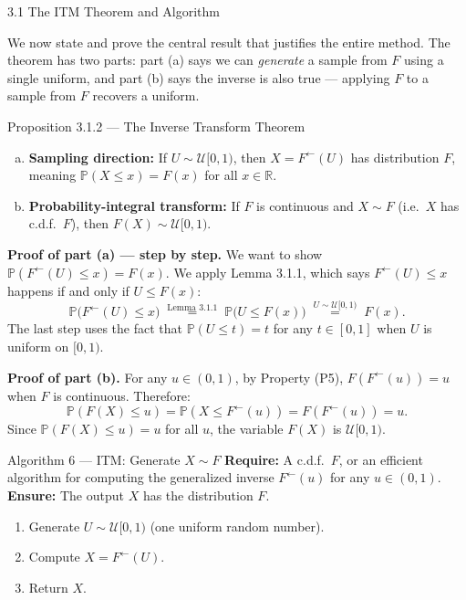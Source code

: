 \documentclass[aspectratio=169,10pt]{beamer}
\newcommand{\PP}{\mathbb{P}}
\newcommand{\RR}{\mathbb{R}}
\newcommand{\UU}{\mathcal{U}}
\newcommand{\FInv}{F^{\leftarrow}}
\begin{document}
\begin{frame}[allowframebreaks]{3.1 The ITM Theorem and Algorithm}

We now state and prove the central result that justifies the entire method.
The theorem has two parts: part (a) says we can \emph{generate} a sample from $F$
using a single uniform, and part (b) says the inverse is also true --- applying $F$
to a sample from $F$ recovers a uniform.

\begin{block}{Proposition 3.1.2 --- The Inverse Transform Theorem}
  \begin{enumerate}[(a)]
    \item \textbf{Sampling direction:} If $U \sim \UU[0,1)$, then
          $X = \FInv(U)$ has distribution $F$, meaning $\PP(X \le x) = F(x)$
          for all $x \in \RR$.
    \item \textbf{Probability-integral transform:} If $F$ is continuous and
          $X \sim F$ (i.e.\ $X$ has c.d.f.\ $F$), then $F(X) \sim \UU[0,1)$.
  \end{enumerate}
\end{block}

\textbf{Proof of part (a) --- step by step.}
We want to show $\PP(\FInv(U) \le x) = F(x)$.  We apply Lemma 3.1.1,
which says $\FInv(U) \le x$ happens if and only if $U \le F(x)$:
\[
  \PP\!\bigl(\FInv(U) \le x\bigr)
  \;\overset{\text{Lemma 3.1.1}}{=}\;
  \PP\!\bigl(U \le F(x)\bigr)
  \;\overset{U \sim \UU[0,1)}{=}\;
  F(x).
\]
The last step uses the fact that $\PP(U \le t) = t$ for any $t \in [0,1]$
when $U$ is uniform on $[0,1)$.

\textbf{Proof of part (b).}  For any $u \in (0,1)$, by Property (P5),
$F(\FInv(u)) = u$ when $F$ is continuous.  Therefore:
\[
  \PP(F(X) \le u) = \PP(X \le \FInv(u)) = F(\FInv(u)) = u.
\]
Since $\PP(F(X) \le u) = u$ for all $u$, the variable $F(X)$ is $\UU[0,1)$.

\framebreak

\begin{alertblock}{Algorithm 6 --- ITM: Generate $X \sim F$}
  \textbf{Require:} A c.d.f.\ $F$, or an efficient algorithm for computing
  the generalized inverse $\FInv(u)$ for any $u \in (0,1)$. \\
  \textbf{Ensure:} The output $X$ has the distribution $F$.
  \begin{enumerate}
    \item Generate $U \sim \UU[0,1)$ (one uniform random number).
    \item Compute $X = \FInv(U)$.
    \item Return $X$.
  \end{enumerate}
\end{alertblock}


\end{frame}
\end{document}
